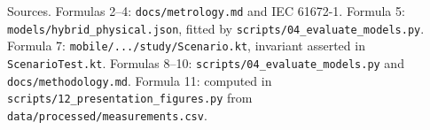 \documentclass[10pt,a4paper]{article}
\begin{document}
\vspace{6mm}
\noindent
{\footnotesize\color{muted}Sources. Formulas 2--4: \texttt{docs/metrology.md} and
IEC 61672-1. Formula 5: \texttt{models/hybrid\_physical.json}, fitted by
\texttt{scripts/04\_evaluate\_models.py}. Formula 7:
\texttt{mobile/.../study/Scenario.kt}, invariant asserted in
\texttt{ScenarioTest.kt}. Formulas 8--10:
\texttt{scripts/04\_evaluate\_models.py} and \texttt{docs/methodology.md}.
Formula 11: computed in \texttt{scripts/12\_presentation\_figures.py} from
\texttt{data/processed/measurements.csv}.}
\end{document}
